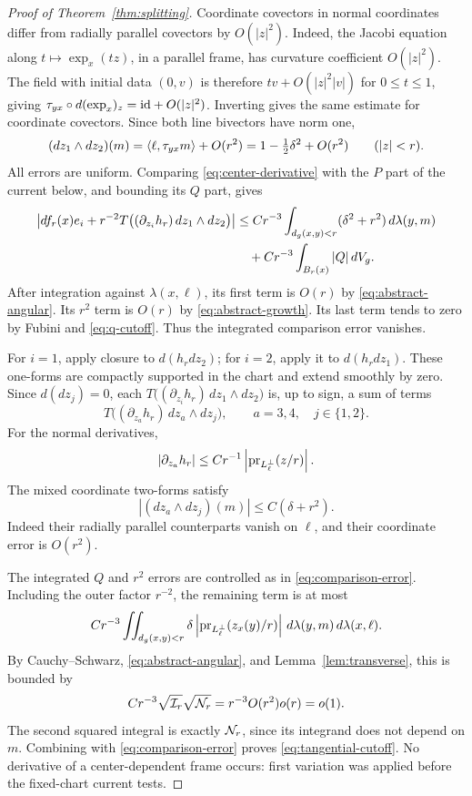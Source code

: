 \begin{proof}[Proof of Theorem~\ref{thm:splitting}]
Coordinate covectors in normal coordinates differ from
radially parallel covectors by \(O(|z|^2)\). Indeed, the
Jacobi equation along \(t\mapsto\exp_x(tz)\), in a parallel
frame, has curvature coefficient \(O(|z|^2)\). The field
with initial data \((0,v)\) is therefore
\(tv+O(|z|^2|v|)\) for \(0\le t\le1\), giving
\(\tau_{yx}\circ d(\exp_x)_z=\mathrm{id}+O(|z|^2)\).
Inverting gives the same estimate for coordinate covectors.
Since both line bivectors have norm one,
\begin{equation}\label{eq:quadratic-coordinate}
(dz_1\wedge dz_2)(m)
=\left\langle \ell,\tau_{yx}m\right\rangle+O(r^2)
=1-\tfrac12\delta^2+O(r^2)\qquad(|z|<r).
\end{equation}
All errors are uniform. Comparing
\eqref{eq:center-derivative} with the \(P\) part of the
current below, and bounding its \(Q\) part, gives
\begin{align}
\left|df_r(x)e_i+
r^{-2}T\bigl((\partial_{z_i}h_r)\,dz_1\wedge dz_2\bigr)\right|
&\le Cr^{-3}\int_{d_g(x,y)<r}(\delta^2+r^2)
                    \,d\lambda(y,m)\nonumber\\
&\quad+Cr^{-3}\int_{B_r(x)}|Q|\,dV_g.
\label{eq:comparison-error}
\end{align}
After integration against \(\lambda(x,\ell)\), its first
term is \(O(r)\) by \eqref{eq:abstract-angular}. Its
\(r^2\) term is \(O(r)\) by \eqref{eq:abstract-growth}.
Its last term tends to zero by Fubini and
\eqref{eq:q-cutoff}. Thus the integrated comparison error
vanishes.

For \(i=1\), apply closure to \(d(h_rdz_2)\); for \(i=2\),
apply it to \(d(h_rdz_1)\). These one-forms are compactly
supported in the chart and extend smoothly by zero.
Since \(d(dz_j)=0\), each
\(T\bigl((\partial_{z_i}h_r)\,dz_1\wedge dz_2\bigr)\)
is, up to sign, a sum of terms
\[
T\bigl((\partial_{z_a}h_r)\,dz_a\wedge dz_j\bigr),
\qquad a=3,4,\quad j\in\{1,2\}.
\]
For the normal derivatives,
\[
|\partial_{z_a}h_r|
\le Cr^{-1}\left|\operatorname{pr}_{L_\ell^\perp}(z/r)\right|.
\]
The mixed coordinate two-forms satisfy
\[
|(dz_a\wedge dz_j)(m)|\le C(\delta+r^2).
\]
Indeed their radially parallel counterparts vanish on
\(\ell\), and their coordinate error is \(O(r^2)\).

The integrated \(Q\) and \(r^2\) errors are controlled as
in \eqref{eq:comparison-error}. Including the outer factor
\(r^{-2}\), the remaining term is at most
\[
Cr^{-3}\iint_{d_g(x,y)<r}
\delta\left|\operatorname{pr}_{L_\ell^\perp}(z_x(y)/r)\right|
\,d\lambda(y,m)\,d\lambda(x,\ell).
\]
By Cauchy--Schwarz, \eqref{eq:abstract-angular}, and
Lemma~\ref{lem:transverse}, this is bounded by
\begin{equation}\label{eq:critical-scaling}
Cr^{-3}\sqrt{\mathcal I_r}\sqrt{\mathcal N_r}
=r^{-3}O(r^2)o(r)=o(1).
\end{equation}
The second squared integral is exactly \(\mathcal N_r\),
since its integrand does not depend on \(m\).
Combining with \eqref{eq:comparison-error} proves
\eqref{eq:tangential-cutoff}. No derivative of a
center-dependent frame occurs: first variation was
applied before the fixed-chart current tests.


\end{proof}
